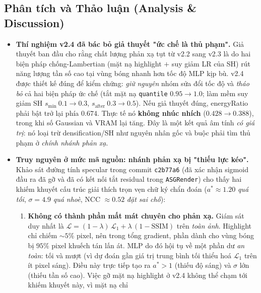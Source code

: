     \subsection{Phân tích và Thảo luận (Analysis \& Discussion)}
    \begin{itemize}
        \item \textbf{Thí nghiệm v2.4 đã bác bỏ giả thuyết "ức chế là thủ phạm".}
        Giả thuyết ban đầu cho rằng chất lượng phản xạ tụt từ v2.2 sang v2.3 là do
        hai biện pháp chống-Lambertian (mặt nạ highlight $+$ suy giảm LR của SH) rút
        năng lượng tần số cao tại vùng bóng nhanh hơn tốc độ MLP kịp bù. v2.4 được
        thiết kế đúng để kiểm chứng: \textit{giữ nguyên} nhóm sửa đổi tốc độ và
        \textit{tháo bỏ} cả hai biện pháp ức chế (tắt mặt nạ \texttt{quantile}
        $0.95\to 1.0$; làm mềm suy giảm SH $s_{\min}\ 0.1\to 0.3$, $s_{\text{after}}\
        0.3\to 0.5$). Nếu giả thuyết đúng, energyRatio phải bật trở lại phía $0.674$.
        Thực tế nó \textbf{không nhúc nhích} ($0.428\to 0.388$), trong khi số Gaussian
        và VRAM lại tăng. Đây là một kết quả âm tính \textit{có giá trị}: nó loại trừ
        densification/SH như nguyên nhân gốc và buộc phải tìm thủ phạm ở \textit{chính
        nhánh phản xạ}.
        \item \textbf{Truy nguyên ở mức mã nguồn: nhánh phản xạ bị "thiếu lực kéo".}
        Khảo sát đường tính specular trong commit \texttt{c2b77a6} (đã xác nhận
        sigmoid đầu ra đã gỡ và đã có kết nối tắt residual trong \texttt{ASGRender})
        cho thấy hai khiếm khuyết cấu trúc giải thích trọn vẹn chữ ký chẩn đoán
        ($a^*\approx 1.20$ \textit{quá tối}, $\sigma=4.9$ \textit{quá nhoè}, NCC
        $\approx 0.52$ \textit{đặt sai chỗ}):
        \begin{enumerate}
            \item \textbf{Không có thành phần mất mát chuyên cho phản xạ.} Giám sát
            duy nhất là $\mathcal{L} = (1-\lambda)\,\mathcal{L}_1 +
            \lambda\,(1-\text{SSIM})$ trên \textit{toàn ảnh}. Highlight chỉ chiếm
            $\sim 5\%$ pixel, nên trong tổng gradient, phần dành cho vùng bóng bị
            $95\%$ pixel khuếch tán lấn át. MLP do đó hội tụ về một phần dư
            \textit{an toàn}: tối và mượt (vì dự đoán gần giá trị trung bình tối
            thiểu hoá $\mathcal{L}_1$ trên ít pixel sáng). Điều này trực tiếp tạo ra
            $a^*>1$ (thiếu độ sáng) và $\sigma$ lớn (thiếu tần số cao). Việc gỡ mặt
            nạ highlight ở v2.4 không thể chạm tới khiếm khuyết này, vì mặt nạ chỉ

\end{enumerate}
\end{itemize}
